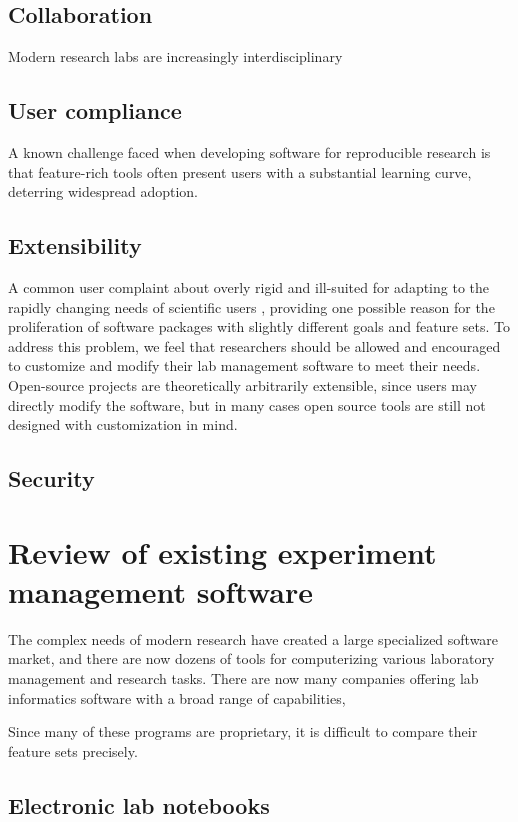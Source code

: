 \documentclass[../thesis]{subfiles}
\begin{document}
\subsection{Collaboration}
Modern research labs are increasingly interdisciplinary

\subsection{User compliance}
A known challenge faced when developing software for reproducible research
is that feature-rich tools often present users with a substantial
learning curve, deterring widespread adoption.

\subsection{Extensibility}
A common user complaint about  overly rigid and ill-suited for
adapting to the rapidly changing needs of scientific users \cite{},
providing one possible reason for the proliferation of software
packages with slightly different goals and feature sets. To address
this problem, we feel that researchers should be allowed and
encouraged to customize and modify their lab management software to
meet their needs. Open-source projects are theoretically arbitrarily
extensible, since users may directly modify the software, but in many
cases open source tools are still not designed with customization in
mind.

\subsection{Security}


\section{Review of existing experiment management \mbox{software}}

The complex needs of modern research have created a large specialized
software market, and there are now dozens of tools for computerizing
various laboratory management and research tasks. There are now many
companies offering lab informatics software with a broad range of
capabilities,

Since many of these programs are proprietary, it is difficult to
compare their feature sets precisely.



\subsection{Electronic lab notebooks}
\end{document}
